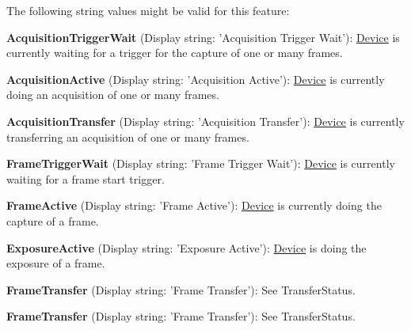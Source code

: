 The following string values might be valid for this feature\+:
\begin{DoxyItemize}
\item {\bfseries Acquisition\+Trigger\+Wait} (Display string\+: 'Acquisition Trigger Wait')\+: \hyperlink{classmv_i_m_p_a_c_t_1_1acquire_1_1_device}{Device} is currently waiting for a trigger for the capture of one or many frames.
\item {\bfseries Acquisition\+Active} (Display string\+: 'Acquisition Active')\+: \hyperlink{classmv_i_m_p_a_c_t_1_1acquire_1_1_device}{Device} is currently doing an acquisition of one or many frames.
\item {\bfseries Acquisition\+Transfer} (Display string\+: 'Acquisition Transfer')\+: \hyperlink{classmv_i_m_p_a_c_t_1_1acquire_1_1_device}{Device} is currently transferring an acquisition of one or many frames.
\item {\bfseries Frame\+Trigger\+Wait} (Display string\+: 'Frame Trigger Wait')\+: \hyperlink{classmv_i_m_p_a_c_t_1_1acquire_1_1_device}{Device} is currently waiting for a frame start trigger.
\item {\bfseries Frame\+Active} (Display string\+: 'Frame Active')\+: \hyperlink{classmv_i_m_p_a_c_t_1_1acquire_1_1_device}{Device} is currently doing the capture of a frame.
\item {\bfseries Exposure\+Active} (Display string\+: 'Exposure Active')\+: \hyperlink{classmv_i_m_p_a_c_t_1_1acquire_1_1_device}{Device} is doing the exposure of a frame.
\item {\bfseries Frame\+Transfer} (Display string\+: 'Frame Transfer')\+: See Transfer\+Status.
\item {\bfseries Frame\+Transfer} (Display string\+: 'Frame Transfer')\+: See Transfer\+Status.
\end{DoxyItemize}

